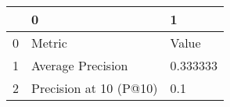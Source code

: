 \begin{tabular}{lll}
\toprule
{} &                       0 &         1 \\
\midrule
0 &                  Metric &     Value \\
1 &       Average Precision &  0.333333 \\
2 &  Precision at 10 (P@10) &       0.1 \\
\bottomrule
\end{tabular}
